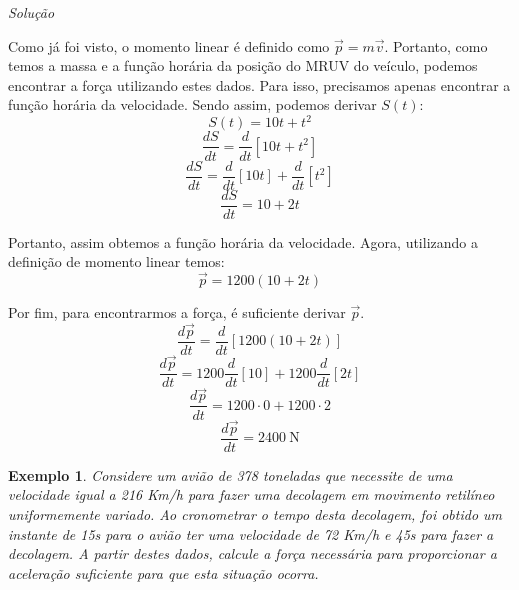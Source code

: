 \documentclass[
	12pt,				%
	openright,			%
    twoside,			%
	a4paper,			%
	chapter=TITLE,		%
	english,			%
	french,				%
	spanish,			%
	brazil				%
	]{abntex2}
\makeatletter
\newtheorem{exemplo}{Exemplo}
\renewenvironment{proof}[1][\proofname]{
	\par\pushQED{\qed}%
	\normalfont \topsep6\p@\@plus6\p@\relax
	\trivlist
	\item\relax
		{\itshape
			#1\@addpunct{.}}\hspace\labelsep\ignorespaces
}{%
	\popQED\endtrivlist\@endpefalse
}
\newenvironment{solution}{
	\begin{proof}[Solução]
}{%
	\end{proof}
}
\numberwithin{lema}{chapter}
\numberwithin{teorema}{chapter}
\numberwithin{definicao}{chapter}
\numberwithin{exemplo}{chapter}
\numberwithin{figure}{chapter}
\makeatother
\begin{document}
\begin{solution}
	Como já foi visto, o momento linear é definido como $\vec{p} = m\vec{v}$. Portanto, como temos a massa e a função horária da posição do MRUV do veículo, podemos encontrar a força utilizando estes dados. Para isso, precisamos apenas encontrar a função horária da velocidade. Sendo assim, podemos derivar $S(t)$:	
	$$S(t) = 10t + t^{2}$$
	$$\dfrac{dS}{dt} = \dfrac{d}{dt}[10t + t^{2}]$$
	$$\dfrac{dS}{dt} = \dfrac{d}{dt}[10t] + \dfrac{d}{dt}[t^{2}]$$
	$$\dfrac{dS}{dt} = 10 + 2t$$
	
	Portanto, assim obtemos a função horária da velocidade. Agora, utilizando a definição de momento linear temos:
	$$\vec{p} = 1200(10 + 2t)$$
	
	Por fim, para encontrarmos a força, é suficiente derivar $\vec{p}$.
	$$\dfrac{d\vec{p}}{dt} = \dfrac{d}{dt}[1200(10 + 2t)]$$
	$$\dfrac{d\vec{p}}{dt} = 1200\dfrac{d}{dt}[10] + 1200\dfrac{d}{dt}[2t]$$
	$$\dfrac{d\vec{p}}{dt} = 1200 \cdot 0 + 1200 \cdot 2$$
	$$\dfrac{d\vec{p}}{dt} = 2400 \ \text{N}$$
	
\end{solution}

\begin{exemplo}
	Considere um avião de 378 toneladas que necessite de uma velocidade igual a 216 Km/h para fazer uma decolagem em movimento retilíneo uniformemente variado. Ao cronometrar o tempo desta decolagem, foi obtido um instante de 15s para o avião ter uma velocidade de 72 Km/h e 45s para fazer a decolagem. A partir destes dados, calcule a força necessária para proporcionar a aceleração suficiente para que esta situação ocorra.
\end{exemplo}
\end{document}
